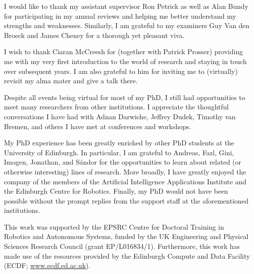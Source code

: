 \documentclass[phd,aiai,twoside,fullspacing,logo]{infthesis}
\theoremstyle{definition}
\theoremstyle{remark}
\numberwithin{claim}{chapter}
\numberwithin{assumption}{chapter}
\numberwithin{conjecture}{chapter}
\numberwithin{constraint}{chapter}
\numberwithin{fact}{chapter}
\numberwithin{proposition}{chapter}
\numberwithin{theorem}{chapter}
\numberwithin{lemma}{chapter}
\numberwithin{definition}{chapter}
\numberwithin{example}{chapter}
\numberwithin{experiment}{chapter}
\begin{document}
\begin{preliminary}
\begin{acknowledgements}
  I would like to thank my assistant supervisor Ron Petrick as well as Alan
  Bundy for participating in my annual reviews and helping me better understand
  my strengths and weaknesses. Similarly, I am grateful to my examiners Guy Van
  den Broeck and James Cheney for a thorough yet pleasant viva.

  I wish to thank Ciaran McCreesh for (together with Patrick Prosser) providing
  me with my very first introduction to the world of research and staying in
  touch over subsequent years. I am also grateful to him for inviting me to
  (virtually) revisit my alma mater and give a talk there.

  Despite all events being virtual for most of my PhD, I still had opportunities
  to meet many researchers from other institutions. I appreciate the thoughtful
  conversations I have had with Adnan Darwiche, Jeffrey Dudek, Timothy van
  Bremen, and others I have met at conferences and workshops.

  My PhD experience has been greatly enriched by other PhD students at the
  University of Edinburgh. In particular, I am grateful to Andreas, Fazl, Gini,
  Imogen, Jonathan, and S\'{a}ndor for the opportunities to learn about related
  (or otherwise interesting) lines of research. More broadly, I have greatly
  enjoyed the company of the members of the Artificial Intelligence Applications
  Institute and the Edinburgh Centre for Robotics. Finally, my PhD would not
  have been possible without the prompt replies from the support staff at the
  aforementioned institutions.

  This work was supported by the EPSRC Centre for Doctoral Training in Robotics
  and Autonomous Systems, funded by the UK Engineering and Physical Sciences
  Research Council (grant EP/L016834/1). Furthermore, this work has made use of
  the resources provided by the Edinburgh Compute and Data Facility (ECDF\@;
  \url{www.ecdf.ed.ac.uk}).
\end{acknowledgements}

\standarddeclaration


\tableofcontents


\end{preliminary}







\singlespace


\end{document}

